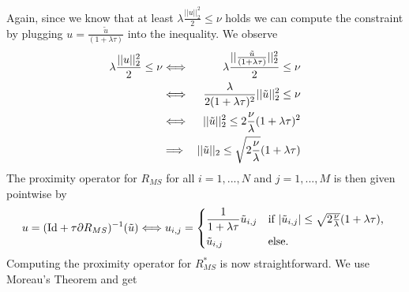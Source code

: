         Again, since we know that at least $\lambda \frac{||u||_{2}^{2}}{2} \le \nu$ holds we can compute the constraint by plugging $u = \frac{\tilde{u}}{(1 + \lambda\tau)}$ into the inequality. We observe
            \begin{eqnarray}
                \lambda \frac{||u||_{2}^{2}}{2} \le \nu &\Longleftrightarrow& \lambda \frac{||\frac{\tilde{u}}{(1 + \lambda\tau)}||_{2}^{2}}{2} \le \nu \notag \\
                &\Longleftrightarrow& \frac{\lambda}{2(1 + \lambda\tau)^{2}} ||\tilde{u}||_{2}^{2} \le \nu \notag \\
                &\Longleftrightarrow& ||\tilde{u}||_{2}^{2} \le 2 \frac{\nu}{\lambda}(1 + \lambda\tau)^{2} \notag \\
                &\Longrightarrow& ||\tilde{u}||_{2} \le \sqrt{2 \frac{\nu}{\lambda}}(1 + \lambda\tau) \notag
            \end{eqnarray}
        The proximity operator for $R_{MS}$ for all $i = 1, ..., N$ and $j = 1, ..., M$ is then given pointwise by
            \begin{equation}
                u = (\textnormal{Id} + \tau \partial R_{MS})^{-1}(\tilde{u}) \Longleftrightarrow u_{i, j} = 
                    \begin{dcases*}
                        \frac{1}{1 + \lambda\tau}\tilde{u}_{i, j} & \textnormal{if $|\tilde{u}_{i, j}| \le \sqrt{2 \frac{\nu}{\lambda}}(1 + \lambda\tau)$,} \\
                        \tilde{u}_{i, j} & \textnormal{else.}
                    \end{dcases*}
            \label{eq:proximity_operator_r}
            \end{equation}
        Computing the proximity operator for $R_{MS}^{\ast}$ is now straightforward. We use Moreau's Theorem and get
